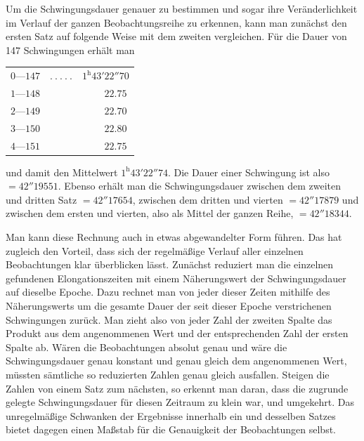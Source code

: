 Um die Schwingungsdauer genauer zu bestimmen und sogar ihre Veränderlichkeit im Verlauf der ganzen Beobachtungsreihe zu erkennen, kann man zunächst den ersten Satz auf folgende Weise mit dem zweiten vergleichen. Für die Dauer von 147 Schwingungen erhält man
\begin{center}
\begin{tabular}{rcl}
$0\text{—}147$ & $.\ .\ .\ .\ .$ & $1^{\mathrm{h}}43'22''70$\\
$1\text{—}148$ & & $\phantom{1^{\mathrm{h}}43'}22.75$\\
$2\text{—}149$ & & $\phantom{1^{\mathrm{h}}43'}22.70$\\
$3\text{—}150$ & & $\phantom{1^{\mathrm{h}}43'}22.80$\\
$4\text{—}151$ & & $\phantom{1^{\mathrm{h}}43'}22.75$
\end{tabular}
\end{center}
und damit den Mittelwert $1^{\mathrm{h}}43'22''74$. Die Dauer einer Schwingung ist also $=42''19551$. Ebenso erhält man die Schwingungsdauer zwischen dem zweiten und dritten Satz $=42''17654$, zwischen dem dritten und vierten $=42''17879$ und zwischen dem ersten und vierten, also als Mittel der ganzen Reihe, $=42''18344$.

Man kann diese Rechnung auch in etwas abgewandelter Form führen. Das hat zugleich den Vorteil, dass sich der regelmäßige Verlauf aller einzelnen Beobachtungen klar überblicken lässt. Zunächst reduziert man die einzelnen gefundenen Elongationszeiten mit einem Näherungswert der Schwingungsdauer auf dieselbe Epoche. Dazu rechnet man von jeder dieser Zeiten mithilfe des Näherungswerts um die gesamte Dauer der seit dieser Epoche verstrichenen Schwingungen zurück. Man zieht also von jeder Zahl der zweiten
Spalte das Produkt aus dem angenommenen Wert und der entsprechenden Zahl der ersten Spalte ab. Wären die Beobachtungen absolut genau und wäre die Schwingungsdauer genau konstant und genau gleich dem angenommenen Wert, müssten sämtliche so reduzierten Zahlen genau gleich ausfallen. Steigen die Zahlen von einem Satz zum nächsten, so erkennt man daran, dass die zugrunde gelegte Schwingungsdauer für diesen Zeitraum zu klein war, und umgekehrt. Das unregelmäßige Schwanken der Ergebnisse innerhalb ein und desselben Satzes bietet dagegen einen Maßstab für die Genauigkeit der Beobachtungen selbst.

